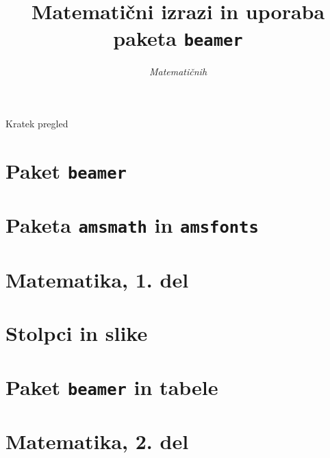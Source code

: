 \documentclass{beamer}
\begin{document}
\title{Matematični izrazi in uporaba paketa \texttt{beamer}}
\subtitle{\emph{Matematičnih}}
\date{}
\titlepage

\begin{frame}{Kratek pregled}
    \tableofcontents%
\end{frame}


 \section{Paket \texttt{beamer}}
 

 \section{Paketa \texttt{amsmath} in \texttt{amsfonts}}
 

 \section[Matematika, 1. del\\\large{Analiza, logika, množice}]{Matematika, 1. del}


 \section{Stolpci in slike}
 

 \section{Paket \texttt{beamer} in tabele}


 \section[Matematika, 2. del\\\large{Zaporedja, algebra, grupe}]{Matematika, 2. del}
 
\end{document}
